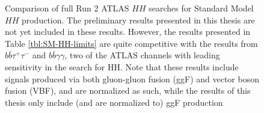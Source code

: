 \begin{figure}[ht]
\centering
{}

\caption{\label{fig:nonres-comparison} Comparison of full Run 2 ATLAS $HH$ searches for Standard Model $HH$ production. 
The preliminary results presented in this thesis are not yet included in these results. However, the results presented 
in Table \ref{tbl:SM-HH-limits} are quite competitive with the results from $b\bar{b}\tau^{+}\tau^{-}$ and 
$b\bar{b}\gamma\gamma$, two of the ATLAS channels with leading sensitivity in the search for HH. Note that these 
results include signals produced via both gluon-gluon fusion (ggF) and vector boson fusion (VBF), and are normalized as 
such, while the results of this thesis only include (and are normalized to) ggF production ~\cite{ATL-PHYS-PUB-2021-031}}
\end{figure}
